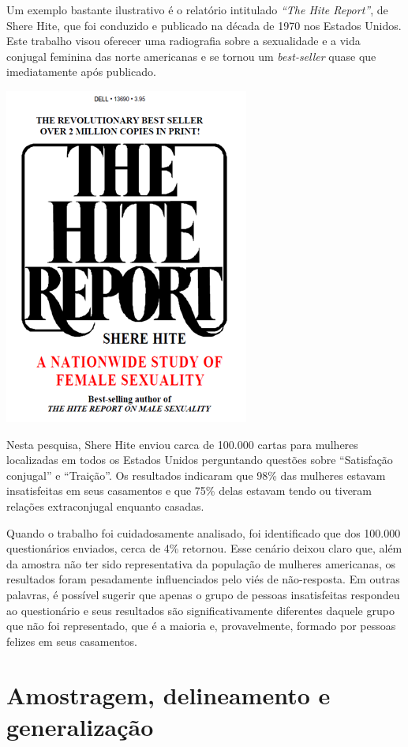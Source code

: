 \documentclass[
]{book}
\begin{document}
Um exemplo bastante ilustrativo é o relatório intitulado \emph{``The
Hite Report''}, de Shere Hite, que foi conduzido e publicado na década
de 1970 nos Estados Unidos. Este trabalho visou oferecer uma radiografia
sobre a sexualidade e a vida conjugal feminina das norte americanas e se
tornou um \emph{best-seller} quase que imediatamente após publicado.

\includegraphics{./img/cap_importancia_amostragem.png}

Nesta pesquisa, Shere Hite enviou carca de 100.000 cartas para mulheres
localizadas em todos os Estados Unidos perguntando questões sobre
``Satisfação conjugal'' e ``Traição''. Os resultados indicaram que 98\%
das mulheres estavam insatisfeitas em seus casamentos e que 75\% delas
estavam tendo ou tiveram relações extraconjugal enquanto casadas.

Quando o trabalho foi cuidadosamente analisado, foi identificado que dos
100.000 questionários enviados, cerca de 4\% retornou. Esse cenário
deixou claro que, além da amostra não ter sido representativa da
população de mulheres americanas, os resultados foram pesadamente
influenciados pelo viés de não-resposta. Em outras palavras, é possível
sugerir que apenas o grupo de pessoas insatisfeitas respondeu ao
questionário e seus resultados são significativamente diferentes daquele
grupo que não foi representado, que é a maioria e, provavelmente,
formado por pessoas felizes em seus casamentos.

\hypertarget{amostragem-delineamento-e-generalizauxe7uxe3o}{%
\section{Amostragem, delineamento e
generalização}\label{amostragem-delineamento-e-generalizauxe7uxe3o}}
\end{document}
